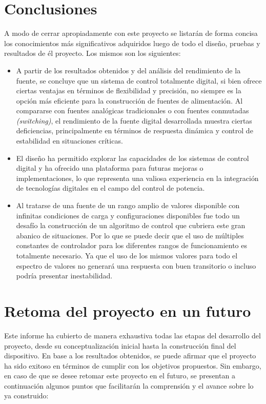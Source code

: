 \section{Conclusiones} 
A modo de cerrar apropiadamente con este proyecto se listarán de forma concisa los conocimientos más significativos adquiridos luego de todo el diseño, pruebas y resultados de él proyecto. Los mismos son los siguientes:\par 
\begin{itemize}
    \item A partir de los resultados obtenidos y del análisis del rendimiento de la fuente, se concluye que un sistema de control totalmente digital, si bien ofrece ciertas ventajas en términos de flexibilidad y precisión, no siempre es la opción más eficiente para la construcción de fuentes de alimentación. Al compararse con fuentes analógicas tradicionales o con fuentes conmutadas \textit{(switching)}, el rendimiento de la fuente digital desarrollada muestra ciertas deficiencias, principalmente en términos de respuesta dinámica y control de estabilidad en situaciones críticas.\par
    \item El diseño ha permitido explorar las capacidades de los sistemas de control digital y ha ofrecido una plataforma para futuras mejoras o implementaciones, lo que representa una valiosa experiencia en la integración de tecnologías digitales en el campo del control de potencia.
    \item Al tratarse de una fuente de un rango amplio de valores disponible con infinitas condiciones de carga y configuraciones disponibles fue todo un desafío la construcción de un algoritmo de control que cubriera este gran abanico de situaciones. Por lo que se puede decir que el uso de múltiples constantes de controlador para los diferentes rangos de funcionamiento es totalmente necesario. Ya que el uso de los mismos valores para todo el espectro de valores no generará una respuesta con buen transitorio o incluso podría presentar inestabilidad.
\end{itemize}

\section{Retoma del proyecto en un futuro} 
Este informe ha cubierto de manera exhaustiva todas las etapas del desarrollo del proyecto, desde su conceptualización inicial hasta la construcción final del dispositivo. En base a los resultados obtenidos, se puede afirmar que el proyecto ha sido exitoso en términos de cumplir con los objetivos propuestos. Sin embargo, en caso de que se desee retomar este proyecto en el futuro, se presentan a continuación algunos puntos que facilitarán la comprensión y el avance sobre lo ya construido:

